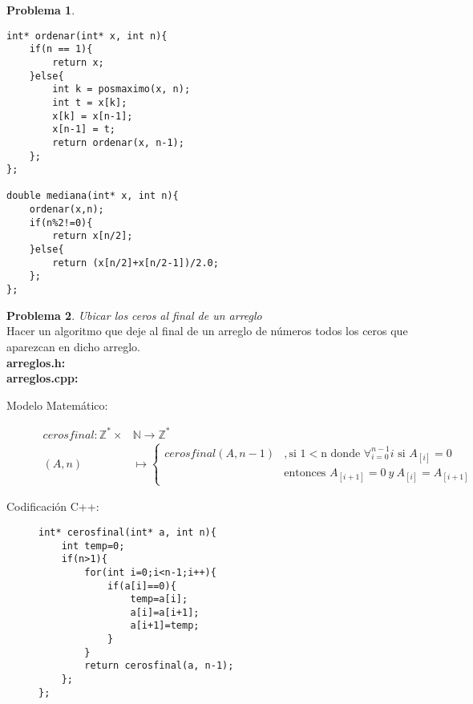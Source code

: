 \documentclass{article}
\theoremstyle{plain}
\theoremstyle{definition}
\newtheorem{problem}{Problema}
\begin{document}
\begin{problem}
\begin{description}
\begin{verbatim}
int* ordenar(int* x, int n){
    if(n == 1){
        return x;
    }else{
        int k = posmaximo(x, n);
        int t = x[k];
        x[k] = x[n-1];
        x[n-1] = t;
        return ordenar(x, n-1);
    };
};

double mediana(int* x, int n){
    ordenar(x,n);
    if(n%2!=0){
        return x[n/2];
    }else{
        return (x[n/2]+x[n/2-1])/2.0;
    };
};
\end{verbatim}
\end{description}
\end{problem}

\begin{problem} \emph{Ubicar los ceros al final de un arreglo}\\
Hacer un algoritmo que deje al final de un arreglo de números todos los ceros que aparezcan en dicho arreglo.\\
\textbf{arreglos.h:}\ \\
\textbf{arreglos.cpp:}\ 
%
\begin{description}
\item[Modelo Matemático:]
%
\begin{align*}
cerosfinal:\mathbb{Z}^*\times&\mathbb{N} \to\mathbb{Z}^*\\
(A,n) &\mapsto
\begin{cases}
cerosfinal(A,n-1)&,\text{si 1$<$n donde $\forall_{i=0}^{n-1}i$ si $A_{[i]}=0$}\\
&\text{entonces $A_{[i+1]}=0\ y\ A_{[i]}=A_{[i+1]}$}
\end{cases}
\end{align*}
%
\item[Codificación \textsf{C++}:]\hfill
%
\begin{verbatim}
int* cerosfinal(int* a, int n){
    int temp=0;
    if(n>1){
        for(int i=0;i<n-1;i++){
            if(a[i]==0){
                temp=a[i];
                a[i]=a[i+1];
                a[i+1]=temp;
            }
        }
        return cerosfinal(a, n-1);
    };
};
\end{verbatim}
\end{description}
\end{problem}
\end{document}
